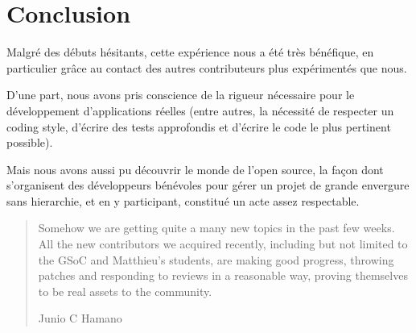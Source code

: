\documentclass[a4paper, 12pt]{article}
\begin{document}
\section{Conclusion}


Malgré des débuts hésitants, cette expérience nous a été très bénéfique, en particulier grâce au contact des autres contributeurs plus expérimentés que nous. 


D'une part, nous avons pris conscience de la rigueur nécessaire pour le développement d’applications réelles (entre autres, la nécessité de respecter un coding style, d'écrire des tests approfondis et d'écrire le code le plus pertinent possible).


Mais nous avons aussi pu découvrir le monde de l’open source, la façon dont s’organisent des développeurs bénévoles pour gérer un projet de grande envergure sans hierarchie, et en y participant, constitué un acte assez respectable.


\begin{quote} 
   Somehow we are getting quite a many new topics in the past few
weeks.  All the new contributors we acquired recently, including but not limited to the GSoC and Matthieu's students, are making good progress, throwing patches and responding to reviews in a reasonable way, proving themselves to be real assets to the community.
   \begin{flushright}
      Junio C Hamano
   \end{flushright}
\end{quote}
\end{document}
